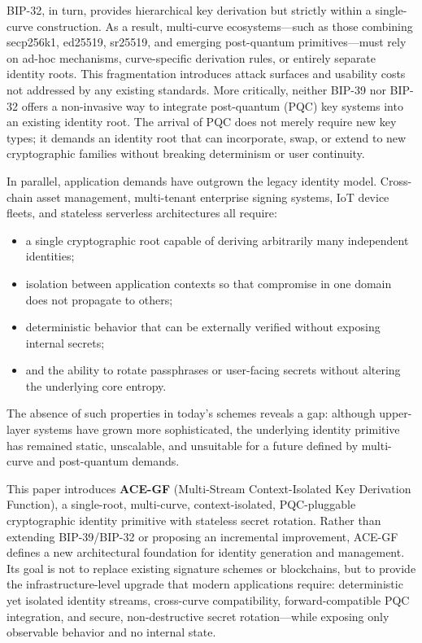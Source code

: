 \documentclass[11pt,a4paper]{article}
\begin{document}
BIP-32, in turn, provides hierarchical key derivation but strictly within a single-curve construction. As a result, multi-curve ecosystems---such as those combining secp256k1, ed25519, sr25519, and emerging post-quantum primitives---must rely on ad-hoc mechanisms, curve-specific derivation rules, or entirely separate identity roots. This fragmentation introduces attack surfaces and usability costs not addressed by any existing standards. More critically, neither BIP-39 nor BIP-32 offers a non-invasive way to integrate post-quantum (PQC) key systems into an existing identity root. The arrival of PQC does not merely require new key types; it demands an identity root that can incorporate, swap, or extend to new cryptographic families without breaking determinism or user continuity.

In parallel, application demands have outgrown the legacy identity model. Cross-chain asset management, multi-tenant enterprise signing systems, IoT device fleets, and stateless serverless architectures all require:
\begin{itemize}[noitemsep, nolistsep]
    \item a single cryptographic root capable of deriving arbitrarily many independent identities;
    \item isolation between application contexts so that compromise in one domain does not propagate to others;
    \item deterministic behavior that can be externally verified without exposing internal secrets;
    \item and the ability to rotate passphrases or user-facing secrets without altering the underlying core entropy.
\end{itemize}
The absence of such properties in today's schemes reveals a gap: although upper-layer systems have grown more sophisticated, the underlying identity primitive has remained static, unscalable, and unsuitable for a future defined by multi-curve and post-quantum demands.

This paper introduces \textbf{ACE-GF} (Multi-Stream Context-Isolated Key Derivation Function), a single-root, multi-curve, context-isolated, PQC-pluggable cryptographic identity primitive with stateless secret rotation. Rather than extending BIP-39/BIP-32 or proposing an incremental improvement, ACE-GF defines a new architectural foundation for identity generation and management. Its goal is not to replace existing signature schemes or blockchains, but to provide the infrastructure-level upgrade that modern applications require: deterministic yet isolated identity streams, cross-curve compatibility, forward-compatible PQC integration, and secure, non-destructive secret rotation---while exposing only observable behavior and no internal state.
\end{document}
